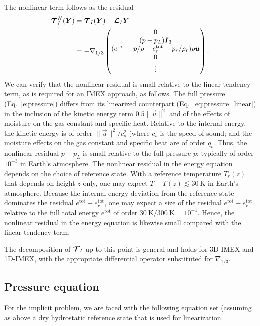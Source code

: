 \documentclass{report}
\numberwithin{equation}{section}
\begin{document}
The nonlinear term follows as the residual 
\begin{equation}\label{e:nonlinear_residual}
\begin{split}
\boldsymbol{{\mathcal{T}}}^N_{I}(\boldsymbol{{Y}}) & =  \boldsymbol{{\mathcal{T}}}_I(\boldsymbol{{Y}}) - \boldsymbol{{\mathcal{L}}}_I \boldsymbol{{Y}} \\
& = 
-\nabla_{1/3} \begin{pmatrix}
0 \\
(p - p_L) \boldsymbol{{I}}_3\\
(e^{\mathrm{tot}}  + p/\rho - e^{\mathrm{tot}}_r - p_r/\rho_r) \rho \boldsymbol{{u}}\\
0\\
\vdots
\end{pmatrix}.
\end{split}
\end{equation}
We can verify that the nonlinear residual is small relative to the linear tendency term, as is required for an IMEX approach, as follows. The full pressure (Eq.~\ref{e:pressure}) differs from its linearized counterpart (Eq.~\ref{eq:pressure_linear}) in the inclusion of the kinetic energy term $0.5 \|\vec{u} \|^2$ and of the effects of moisture on the gas constant and specific heat. Relative to the internal energy, the kinetic energy is of order $\|\vec{u}\|^2/c_s^2$ (where $c_s$ is the speed of sound; 
and the moisture effects on the gas constant and specific heat are of order $q_t$. Thus, the nonlinear residual $p-p_L$ is small relative to the full pressure $p$: typically of order $10^{-3}$ in Earth's atmosphere. The nonlinear residual in the energy equation depends on the choice of reference state. With a reference temperature $T_r(z)$ that depends on height $z$ only, one may expect $T - T(z) \lesssim 30~\mathrm{K}$ in Earth's atmosphere. Because the internal energy deviation from the reference state dominates the residual $e^{\mathrm{tot}} - e^{\mathrm{tot}}_r$, one may expect a size of the residual $e^{\mathrm{tot}} - e^{\mathrm{tot}}_r$ relative to the full total energy $e^{\mathrm{tot}}$ of order $30~\mathrm{K}/300~\mathrm{K} = 10^{-1}$. Hence, the nonlinear residual in the energy equation is likewise small compared with the linear tendency term. 
 
The decomposition of $\boldsymbol{{\mathcal{T}}}_I$ up to this point is general and holds for 3D-IMEX and 1D-IMEX, with the appropriate differential operator substituted for $\nabla_{1/3}$.

\subsection{Pressure equation}
For the implicit problem, we are faced with the following equation set (assuming as above a dry hydrostatic reference state that is used for linearization.
\end{document}
